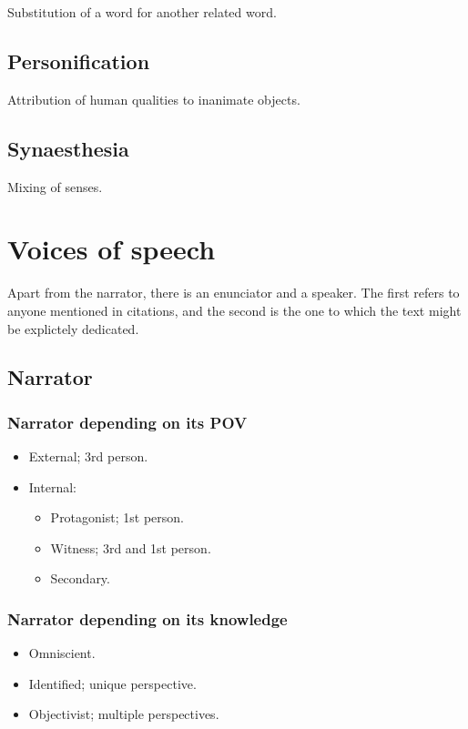 \documentclass{article}
\begin{document}
Substitution of a word for another related word.

\subsection*{Personification}

Attribution of human qualities to inanimate objects.

\subsection*{Synaesthesia}

Mixing of senses.

\section*{Voices of speech}

Apart from the narrator, there is an enunciator and a speaker.
The first refers to anyone mentioned in citations, and the second is the one to
which the text might be explictely dedicated.

\subsection*{Narrator}

\subsubsection*{Narrator depending on its POV}

\begin{itemize}
    \item External; 3rd person.
    \item Internal:
    \begin{itemize}
        \item Protagonist; 1st person.
        \item Witness; 3rd and 1st person.
        \item Secondary.
    \end{itemize}
\end{itemize}

\subsubsection*{Narrator depending on its knowledge}

\begin{itemize}
    \item Omniscient.
    \item Identified; unique perspective.
    \item Objectivist; multiple perspectives.
\end{itemize}
\end{document}
